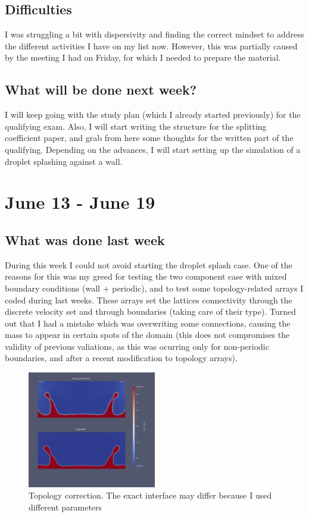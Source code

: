 \documentclass[12pt]{article}
\begin{document}
	\subsection*{Difficulties}
	I was struggling a bit with dispersivity and finding the correct mindset to address the different activities I have on my list now. However, this was partially caused by the meeting I had on Friday, for which I needed to prepare the material. 
	
	\subsection*{What will be done next week?}
	I will keep going with the study plan (which I already started previously) for the qualifying exam. Also, I will start writing the structure for the splitting coefficient paper, and grab from here some thoughts for the written part of the qualifying. Depending on the advances, I will start setting up 
	the simulation of a droplet splashing against a wall. 	
	
	\pagebreak
	\section*{June 13 - June 19}
	\subsection*{What was done last week}
	During this week I could not avoid starting the droplet splash case. One of the reasons for this was my greed for testing the two component case with mixed boundary conditions (wall + periodic), and to test some topology-related arrays I coded during last weeks. These arrays set the lattices connectivity through the discrete velocity set and through boundaries (taking care of their type). Turned out that I had a mistake which was overwriting some connections, causing the mass to appear in certain spots of the domain (this does not compromises the validity of previous valiations, as this was ocurring only for non-periodic boundaries, and after a recent modification to topology arrays). 

	\begin{figure}
		\caption{Topology correction. The exact interface may differ because I used different parameters }
		\includegraphics[width=0.5\textwidth]{pics/correctedSplah.png}
	\end{figure}
\end{document}

